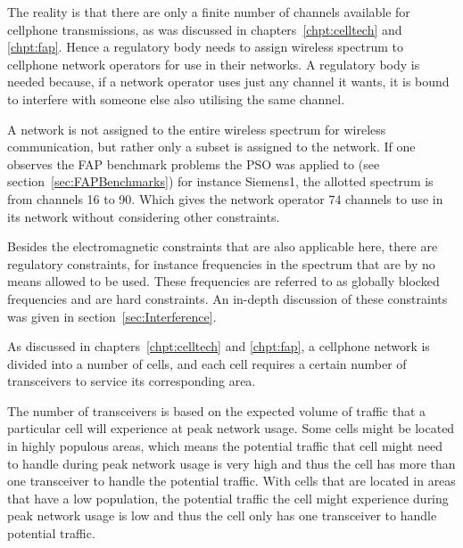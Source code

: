 The reality is that there are only a finite number of channels available for cellphone transmissions, as was discussed in chapters~\ref{chpt:celltech} and \ref{chpt:fap}. Hence a regulatory body needs to assign wireless spectrum to cellphone network operators for use in their networks. A regulatory body is needed because, if a network operator uses just any channel it wants, it is bound to interfere with someone else also utilising the same channel.

A network is not assigned to the entire wireless spectrum for wireless communication, but rather only a subset is assigned to the network. If one observes the FAP benchmark problems the PSO was applied to (see section~\ref{sec:FAPBenchmarks}) for instance Siemens1, the allotted spectrum is from channels 16 to 90. Which gives the network operator 74 channels to use in its network without considering other constraints. 

Besides the electromagnetic constraints that are also applicable here, there are regulatory constraints, for instance frequencies in the spectrum that are by no means allowed to be used. These frequencies are referred to as globally blocked frequencies and are hard constraints. An in-depth discussion of these constraints was given in section~\ref{sec:Interference}.

As discussed in chapters~\ref{chpt:celltech} and \ref{chpt:fap}, a cellphone network is divided into a number of cells, and each cell requires a certain number of transceivers to service its corresponding area. 

The number of transceivers is based on the expected volume of traffic that a particular cell will experience at peak network usage. Some cells might be located in highly populous areas, which means the potential traffic that cell might need to handle during peak network usage is very high and thus the cell has more than one transceiver to handle the potential traffic. With cells that are located in areas that have a low population, the potential traffic the cell might experience during peak network usage is low and thus the cell only has one transceiver to handle potential traffic.

